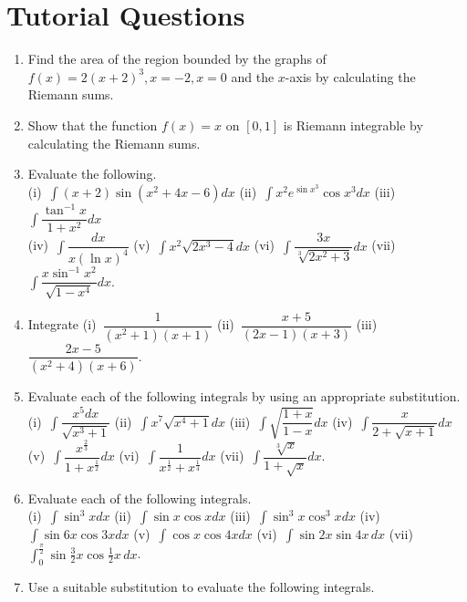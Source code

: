 \documentclass[titlepage,a4paper,12pt]{report}
\begin{document}
\section{Tutorial Questions}
\begin{enumerate}
\item Find the area of the region bounded by the graphs of $f(x)=2(x+2)^3, x=-2, x=0$ and the $x$-axis by calculating the Riemann sums.
\item Show that the function $f(x)=x$ on $[0,1]$ is Riemann integrable by calculating the Riemann sums.
\item Evaluate the following.\\
(i)\, $\displaystyle \int (x+2)\sin (x^2+4x-6)dx$ \quad (ii)\, $\displaystyle \int x^2e^{\sin x^3}\cos x^3 dx$ \quad (iii)\, $\displaystyle \int \dfrac{\tan ^{-1} x}{1+x^2}dx$ \\ (iv)\, $\displaystyle \int \dfrac{dx}{x(\ln x)^4}$ \quad (v)\, $\displaystyle \int x^2\sqrt{2x^3-4}dx$ \quad (vi)\, $\displaystyle \int \dfrac{3x}{\sqrt[3]{2x^2+3}}dx$ \quad (vii)\, $\displaystyle \int \dfrac{x\sin ^{-1}x^2}{\sqrt{1-x^4}}dx$.
\item Integrate (i)\, $\dfrac{1}{(x^2+1)(x+1)}$ \quad (ii)\, $\dfrac{x+5}{(2x-1)(x+3)}$ \quad (iii)\, $\dfrac{2x-5}{(x^2+4)(x+6)}$.
\item Evaluate each of the following integrals by using an appropriate substitution.\\
(i)\, $\displaystyle \int \dfrac{x^5 dx}{\sqrt{x^3+1}}$ \quad (ii)\, $\displaystyle \int x^7\sqrt{x^4+1}dx$ \quad (iii)\, $\displaystyle \int \sqrt{\dfrac{1+x}{1-x}}dx$ \quad (iv)\, $\displaystyle \int \dfrac{x}{2+\sqrt{x+1}}dx$\\ (v)\, $\displaystyle \int  \dfrac{x^{\frac{2}{3}}}{1+x^{\frac{1}{2}}}dx$ \quad (vi)\, $\displaystyle \int \dfrac{1}{x^{\frac{1}{2}}+x^{\frac{1}{4}}}dx$ \quad (vii)\, $\displaystyle \int \dfrac{\sqrt[3]{x}}{1+\sqrt{x}}dx$.
\item Evaluate each of the following integrals.\\
(i)\, $\displaystyle \int \sin ^3 x dx$ \quad (ii)\, $\displaystyle \int \sin x \cos x dx$ \quad (iii)\, $\displaystyle \int \sin ^3 x \cos ^3 x dx$ \quad (iv)\, $\displaystyle \int \sin 6x \cos 3x dx$ \quad (v)\, $\displaystyle \int \cos x \cos 4x dx$ \quad (vi)\, $\displaystyle \int \sin 2x\sin 4x\, dx$ \quad (vii)\, $\displaystyle \int _0^{\frac{\pi}{2}}\sin \frac{3}{2}x \cos \frac{1}{2}x\, dx$.
\item Use a suitable substitution to evaluate the following integrals.\\

\end{enumerate}
\end{document}
